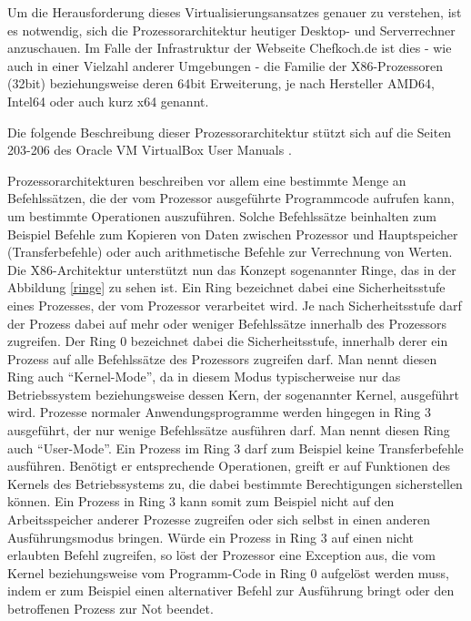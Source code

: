 Um die Herausforderung dieses Virtualisierungsansatzes genauer zu verstehen, ist es notwendig, sich die Prozessorarchitektur heutiger Desktop- und Serverrechner anzuschauen. Im Falle der Infrastruktur der Webseite Chefkoch.de ist dies - wie auch in einer Vielzahl anderer Umgebungen - die Familie der X86-Prozessoren (32bit) beziehungsweise deren 64bit Erweiterung, je nach Hersteller AMD64, Intel64 oder auch kurz x64 genannt.

Die folgende Beschreibung dieser Prozessorarchitektur stützt sich auf die Seiten 203-206 des Oracle VM VirtualBox User Manuals \citep{Oracle14}.

Prozessorarchitekturen beschreiben vor allem eine bestimmte Menge an Befehlssätzen, die der vom Prozessor ausgeführte Programmcode aufrufen kann, um bestimmte Operationen auszuführen. Solche Befehlssätze beinhalten zum Beispiel Befehle zum Kopieren von Daten zwischen Prozessor und Hauptspeicher (Transferbefehle) oder auch arithmetische Befehle zur Verrechnung von Werten. Die X86-Architektur unterstützt nun das Konzept sogenannter Ringe, das in der Abbildung \ref{ringe} zu sehen ist. Ein Ring bezeichnet dabei eine Sicherheitsstufe eines Prozesses, der vom Prozessor verarbeitet wird. Je nach Sicherheitsstufe darf der Prozess dabei auf mehr oder weniger Befehlssätze innerhalb des Prozessors zugreifen. Der Ring 0 bezeichnet dabei die Sicherheitsstufe, innerhalb derer ein Prozess auf alle Befehlssätze des Prozessors zugreifen darf. Man nennt diesen Ring auch "`Kernel-Mode"', da in diesem Modus typischerweise nur das Betriebssystem beziehungsweise dessen Kern, der sogenannter Kernel, ausgeführt wird. Prozesse normaler Anwendungsprogramme werden hingegen in Ring 3 ausgeführt, der nur wenige Befehlssätze ausführen darf. Man nennt diesen Ring auch "`User-Mode"'. Ein Prozess im Ring 3 darf zum Beispiel keine Transferbefehle ausführen. Benötigt er entsprechende Operationen, greift er auf Funktionen des Kernels des Betriebssystems zu, die dabei bestimmte Berechtigungen sicherstellen können. Ein Prozess in Ring 3 kann somit zum Beispiel nicht auf den Arbeitsspeicher anderer Prozesse zugreifen oder sich selbst in einen anderen Ausführungsmodus bringen. Würde ein Prozess in Ring 3 auf einen nicht erlaubten Befehl zugreifen, so löst der Prozessor eine Exception aus, die vom Kernel beziehungsweise vom Programm-Code in Ring 0 aufgelöst werden muss, indem er zum Beispiel einen alternativer Befehl zur Ausführung bringt oder den betroffenen Prozess zur Not beendet.

